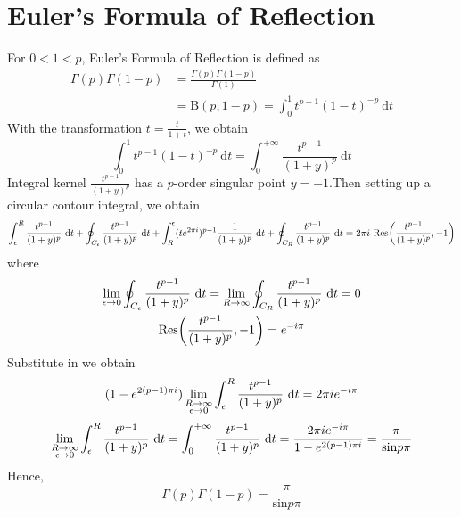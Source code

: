 \documentclass[25pt]{article}
\begin{document}
\section{Euler's Formula of Reflection}
For $0 < 1 < p$, Euler's Formula of Reflection is defined as 
\begin{equation}
\begin{aligned}
    \Gamma(p)\Gamma(1-p) &= \frac{\Gamma(p)\Gamma(1-p)}{\Gamma(1)}\\
    &= \text{B}(p, 1-p) = \int^{1}_{0} t^{p-1} (1-t)^{-p}~\text{d}t
\end{aligned}
\end{equation}
With the transformation $t = \frac{t}{1+t}$, we obtain
\begin{equation}
    \int^{1}_{0} t^{p-1}(1-t)^{-p}~\text{d}t = \int^{+\infty}_{0} \frac{t^{p-1}}{(1+y)^p}~\text{d}t
\end{equation}
Integral kernel $\frac{t^{p-1}}{(1+y)^p}$ has a $p$-order singular point $y = -1$.Then setting up a circular contour integral, we obtain
\begin{equation}
    \int^{R}_{\epsilon} \frac{t^{p-1}}{(1+y)^p}~\text{d}t + \oint_{C_{\epsilon}} \frac{t^{p-1}}{(1+y)^p}~\text{d}t + \int^{\epsilon}_{R} (te^{2 \pi i})^{p-1} \frac{1}{(1+y)^p}~\text{d}t + \oint_{C_R} \frac{t^{p-1}}{(1+y)^p}~\text{d}t = 2 \pi i~ \text{Res}\bigg(\frac{t^{p-1}}{(1+y)^p}, -1 \bigg) \notag
\end{equation}
where
\begin{gather}
    \lim_{\epsilon \rightarrow 0} \oint_{C_{\epsilon}}\frac{t^{p-1}}{(1+y)^p}~\text{d}t = \lim_{R \rightarrow \infty} \oint_{C_R}\frac{t^{p-1}}{(1+y)^p} ~\text{d}t = 0\notag\\
    \text{Res}\bigg( \frac{t^{p-1}}{(1+y)^p}, -1 \bigg) = e^{-i \pi} \notag
\end{gather}
Substitute in we obtain
\begin{equation}
    (1-e^{2(p-1)\pi i}) \lim_{\substack{R \rightarrow \infty \\ \epsilon \rightarrow 0} } \int^{R}_{\epsilon} \frac{t^{p-1}}{(1+y)^p}~\text{d}t = 2\pi i e^{-i \pi} \notag
\end{equation}
\begin{equation}
    \lim_{\substack{R \rightarrow \infty \\ \epsilon \rightarrow 0} } \int^{R}_{\epsilon} \frac{t^{p-1}}{(1+y)^p}~\text{d}t = \int^{+\infty}_{0} \frac{t^{p-1}}{(1+y)^p} ~\text{d}t = \frac{2 \pi i e^{-i \pi}}{1-e^{2(p-1)\pi i}}= \frac{\pi}{\text{sin}p \pi} \notag
\end{equation}
Hence, 
\begin{equation}
    \boxed{\Gamma(p)\Gamma(1-p) = \frac{\pi}{\text{sin} p \pi}}
\end{equation}
\end{document}
